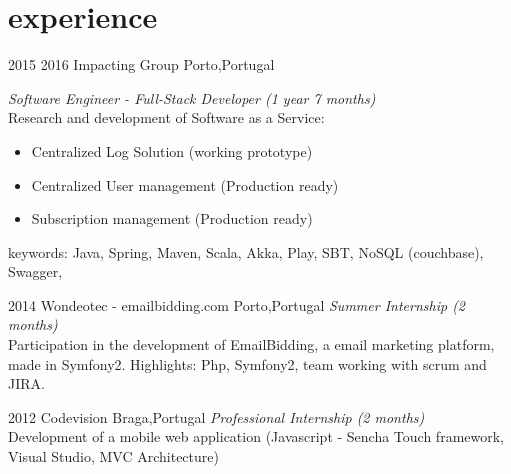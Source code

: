 \documentclass[]{friggeri-cv} %
\begin{document}


\section{experience}

\begin{entrylist}
\entry
{2015 2016}
{Impacting Group }
{Porto,Portugal}
{\emph{Software Engineer - Full-Stack Developer (1 year 7 months)} \\
Research and development of Software as a Service:
\begin{itemize}
 \item Centralized Log Solution (working prototype)
 \item Centralized User management (Production ready)
 \item Subscription management (Production ready)
\end{itemize}
keywords: Java, Spring, Maven, Scala, Akka, Play, SBT, NoSQL (couchbase), Swagger,
}

\entry
{2014}
{Wondeotec - {\normalfont emailbidding.com}}
{Porto,Portugal}
{\emph{Summer Internship (2 months)} \\
Participation in the development of EmailBidding, a email marketing platform, made in Symfony2. Highlights: Php, Symfony2, team working with scrum and JIRA.
}

\entry
{2012}
{Codevision}
{Braga,Portugal}
{\emph{Professional Internship (2 months)} \\
Development of a mobile web application (Javascript - Sencha Touch framework, Visual Studio, MVC Architecture)
}
\end{entrylist}


\end{document}
